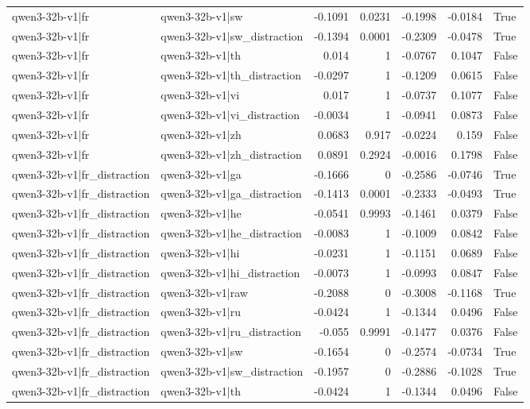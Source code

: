 \begin{table}
\begin{tabular}{l l r r r r l}
qwen3-32b-v1|fr & qwen3-32b-v1|sw & -0.1091 & 0.0231 & -0.1998 & -0.0184 & True \\
qwen3-32b-v1|fr & qwen3-32b-v1|sw_distraction & -0.1394 & 0.0001 & -0.2309 & -0.0478 & True \\
qwen3-32b-v1|fr & qwen3-32b-v1|th & 0.014 & 1 & -0.0767 & 0.1047 & False \\
qwen3-32b-v1|fr & qwen3-32b-v1|th_distraction & -0.0297 & 1 & -0.1209 & 0.0615 & False \\
qwen3-32b-v1|fr & qwen3-32b-v1|vi & 0.017 & 1 & -0.0737 & 0.1077 & False \\
qwen3-32b-v1|fr & qwen3-32b-v1|vi_distraction & -0.0034 & 1 & -0.0941 & 0.0873 & False \\
qwen3-32b-v1|fr & qwen3-32b-v1|zh & 0.0683 & 0.917 & -0.0224 & 0.159 & False \\
qwen3-32b-v1|fr & qwen3-32b-v1|zh_distraction & 0.0891 & 0.2924 & -0.0016 & 0.1798 & False \\
qwen3-32b-v1|fr_distraction & qwen3-32b-v1|ga & -0.1666 & 0 & -0.2586 & -0.0746 & True \\
qwen3-32b-v1|fr_distraction & qwen3-32b-v1|ga_distraction & -0.1413 & 0.0001 & -0.2333 & -0.0493 & True \\
qwen3-32b-v1|fr_distraction & qwen3-32b-v1|he & -0.0541 & 0.9993 & -0.1461 & 0.0379 & False \\
qwen3-32b-v1|fr_distraction & qwen3-32b-v1|he_distraction & -0.0083 & 1 & -0.1009 & 0.0842 & False \\
qwen3-32b-v1|fr_distraction & qwen3-32b-v1|hi & -0.0231 & 1 & -0.1151 & 0.0689 & False \\
qwen3-32b-v1|fr_distraction & qwen3-32b-v1|hi_distraction & -0.0073 & 1 & -0.0993 & 0.0847 & False \\
qwen3-32b-v1|fr_distraction & qwen3-32b-v1|raw & -0.2088 & 0 & -0.3008 & -0.1168 & True \\
qwen3-32b-v1|fr_distraction & qwen3-32b-v1|ru & -0.0424 & 1 & -0.1344 & 0.0496 & False \\
qwen3-32b-v1|fr_distraction & qwen3-32b-v1|ru_distraction & -0.055 & 0.9991 & -0.1477 & 0.0376 & False \\
qwen3-32b-v1|fr_distraction & qwen3-32b-v1|sw & -0.1654 & 0 & -0.2574 & -0.0734 & True \\
qwen3-32b-v1|fr_distraction & qwen3-32b-v1|sw_distraction & -0.1957 & 0 & -0.2886 & -0.1028 & True \\
qwen3-32b-v1|fr_distraction & qwen3-32b-v1|th & -0.0424 & 1 & -0.1344 & 0.0496 & False \\

\end{tabular}
\end{table}

